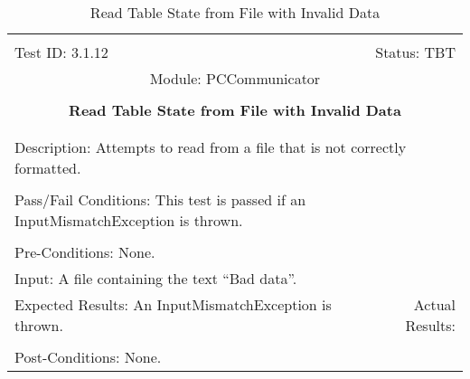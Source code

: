 \documentclass[titlepage]{article}
\begin{document}
\begin{center}%
\begin{table}
\begin{tabular}{|l r|}\hline&\\[-2mm]
	Test ID: 3.1.12	&Status: TBT\\[-3mm]
	\multicolumn{2}{|c|}{Module: PCCommunicator}\\&\\
	\multicolumn{2}{|c|}{\textbf{\large{Read Table State from File with Invalid Data}}}\\&\\\hline&\\[-3mm]
	\multicolumn{2}{|p{\textwidth}|}{Description: Attempts to read from a file that is not correctly formatted.}\\[1mm]\hline&\\[-3mm]
	\multicolumn{2}{|p{\textwidth}|}{Pass/Fail Conditions: This test is passed if an InputMismatchException is thrown.}\\[1mm]\hline&\\[-3mm]
	\multicolumn{2}{|p{\textwidth}|}{Pre-Conditions: None.}\\[4mm]
	\multicolumn{2}{|p{\textwidth}|}{Input: A file containing the text ``Bad data''.}\\[2mm]\hline
	\multicolumn{1}{|p{0.49\textwidth}}{Expected Results: An InputMismatchException is thrown.}	&\multicolumn{1}{|p{0.45\textwidth}|}{Actual Results: }\\\hline&\\[-3mm]
	\multicolumn{2}{|p{\textwidth}|}{Post-Conditions: None.}\\\hline
\end{tabular}
\caption{Read Table State from File with Invalid Data}
\end{table}
\end{center}
\end{document}
